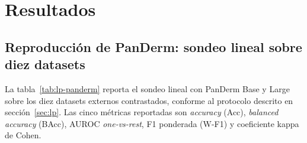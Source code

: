 
\chapter{Resultados}
\label{cap:resultados}

\section{Reproducción de PanDerm: sondeo lineal sobre diez datasets}
\label{sec:rep-panderm}

La tabla~\ref{tab:lp-panderm} reporta el sondeo lineal con PanDerm
Base y Large sobre los diez datasets externos contrastados, conforme
al protocolo descrito en secci\'on~\ref{sec:lp}. Las cinco métricas
reportadas son \emph{accuracy} (Acc), \emph{balanced accuracy}
(BAcc), AUROC \emph{one-vs-rest}, F1 ponderada (W-F1) y coeficiente
kappa de Cohen.

